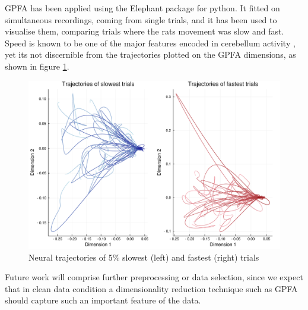 GPFA has been applied using the Elephant \cite{elephant18} package for python. It fitted on simultaneous recordings, coming from single trials, and it has been used to visualise them, comparing trials where the rats movement was slow and fast. 
Speed is known to be one of the major features encoded in cerebellum activity \cite{becker2019cerebellar}, yet its not discernible from the trajectories plotted on the GPFA dimensions, as shown in figure \ref{fig:gpfa-speed}.
\begin{figure}[h!]
	\centering
	\includegraphics[scale=0.5]{../../plots/gpfa-slow-vs-fast.pdf}
	\caption{Neural trajectories of 5\% slowest (left) and fastest (right) trials}
	\label{fig:gpfa-speed}
\end{figure}
Future work will comprise further preprocessing or data selection, since we expect that in clean data condition a dimensionality reduction technique such as GPFA should capture such an important feature of the data.

